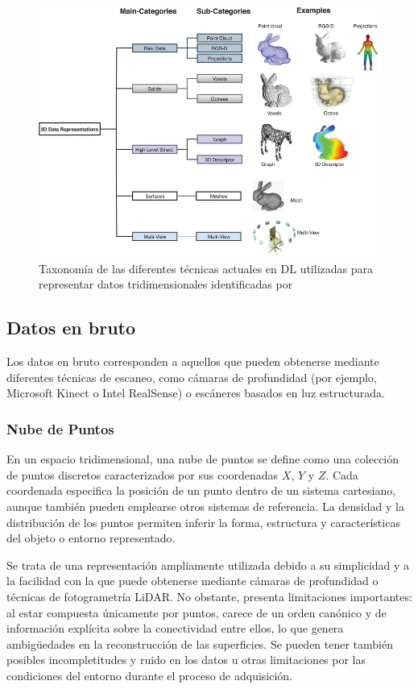 \begin{figure}[h]
    \centering
    \includegraphics[width=\linewidth]{figures/2_theory/3Dtaxonomy.png}
    \caption[Taxonomía de las representaciones 3D para Deep Learning]{Taxonomía de las diferentes técnicas actuales en DL utilizadas para representar datos tridimensionales identificadas por \cite{gezawa_review_2020}}
    \label{fig:3dTaxonomy}
\end{figure}

\subsection{Datos en bruto}
Los datos en bruto corresponden a aquellos que pueden obtenerse mediante diferentes técnicas de escaneo, como cámaras de profundidad (por ejemplo, Microsoft Kinect o Intel RealSense) o escáneres basados en luz estructurada.

\subsubsection{Nube de Puntos}
En un espacio tridimensional, una nube de puntos se define como una colección de puntos discretos caracterizados por sus coordenadas $X$, $Y$ y $Z$. Cada coordenada especifica la posición de un punto dentro de un sistema cartesiano, aunque también pueden emplearse otros sistemas de referencia. La densidad y la distribución de los puntos permiten inferir la forma, estructura y características del objeto o entorno representado.

Se trata de una representación ampliamente utilizada debido a su simplicidad y a la facilidad con la que puede obtenerse mediante cámaras de profundidad o técnicas de fotogrametría LiDAR. No obstante, presenta limitaciones importantes: al estar compuesta únicamente por puntos, carece de un orden canónico y de información explícita sobre la conectividad entre ellos, lo que genera ambigüedades en la reconstrucción de las superficies. Se pueden tener también posibles incompletitudes y ruido en los datos u otras limitaciones por las condiciones del entorno durante el proceso de adquisición.


